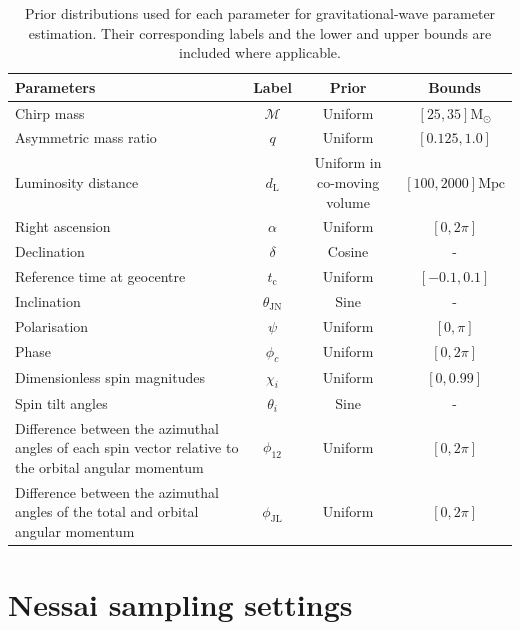 \documentclass[%
 reprint,
nofootinbib,
 amsmath,amssymb,
 aps,
 prd,
]{revtex4-2}
\newcommand{\nessai}{{\sc Nessai}\xspace}
\newcommand{\doublefigwidth}{17.2cm}
\begin{document}
\begin{widetext}
\begin{table}[h]
\caption{Prior distributions used for each parameter for gravitational-wave parameter estimation. Their corresponding labels and the lower and upper bounds are included where applicable.}
\begin{tabularx}{\doublefigwidth}{Xccc} \toprule
    Parameters & Label & Prior & Bounds \\ \midrule
    Chirp mass & $\mathcal{M}$ & Uniform & $[25, 35] {\text{M}_{\odot}}$  \\
    Asymmetric mass ratio & $q$ & Uniform & $[0.125, 1.0]$ \\
    Luminosity distance & $d_{\text{L}}$ & Uniform in co-moving volume & $[100, 2000] {\text{Mpc}}$ \\
    Right ascension & $\alpha$ & Uniform & $[0, 2 \pi]$ \\
    Declination & $\delta$ & Cosine & - \\
    Reference time at geocentre & $t_{\text{c}}$ & Uniform & $[-0.1, 0.1]$ \\
    Inclination & $\theta_{\text{JN}}$ & Sine & - \\
    Polarisation & $\psi$ & Uniform & $[0, \pi]$ \\
    Phase & $\phi_{c}$ & Uniform & $[0, 2 \pi]$ \\
    Dimensionless spin magnitudes & $\chi_i$ & Uniform & $[0, 0.99]$ \\
    Spin tilt angles & $\theta_i$ & Sine & - \\
    Difference between the azimuthal angles of each spin vector relative to the orbital angular momentum & $\phi_{12}$ & Uniform & $[0, 2 \pi]$ \\
    Difference between the azimuthal angles of the  total and orbital angular momentum & $\phi_{\text{JL}}$ & Uniform & $[0, 2 \pi]$ \\
    \bottomrule
\end{tabularx}
\end{table}

\section{\nessai sampling settings}\label{app:sampling-settings}


\end{widetext}
\end{document}
